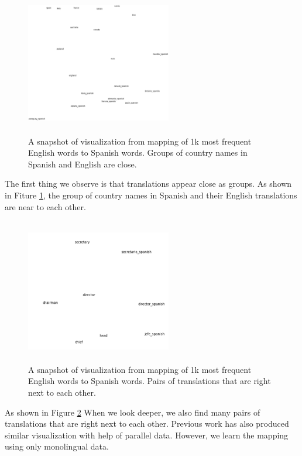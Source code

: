  \begin{figure}[!ht]
  \centering
  \includegraphics[width=2.5in,height=2.5in]{viz_countries}
  \caption{A snapshot of visualization from mapping of 1k most frequent English words to Spanish words. Groups of country names in Spanish and English are close.}
\label{viz_countries}
\end{figure}

The first thing we observe is that translations appear close as groups. As shown in 
Fiture \ref{viz_countries}, the group of country names in Spanish and their English translations are near to each other.


 \begin{figure}[!ht]
  \centering
  \includegraphics[width=2.5in,height=2.5in]{viz_top1000}
  \caption{A snapshot of visualization from mapping of 1k most frequent English words to Spanish words. Pairs of translations that are right next to each other.}
\label{viz_close}
\end{figure}

As shown in Figure \ref{viz_close} When we look deeper, we also find many pairs of translations that are right next to each other. Previous work has also produced similar visualization with help of parallel data. However, we learn the mapping using only monolingual data.
